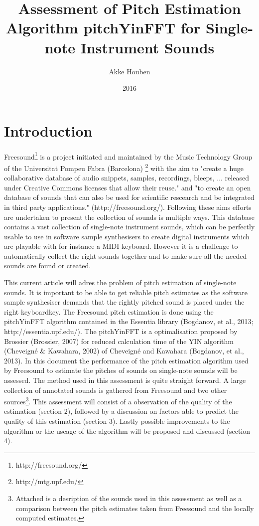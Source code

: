 \documentclass{proc}
\title{Assessment of Pitch Estimation Algorithm pitchYinFFT for Single-note Instrument Sounds}
\author{Akke Houben}
\date{2016}
\begin{document}
\maketitle

\section{Introduction}
Freesound\footnote{http://freesound.org/} is a project initiated and maintained by the Music Technology Group of the Universitat Pompeu Fabra (Barcelona) \footnote{http://mtg.upf.edu/} with the aim to "create a huge collaborative database of audio snippets, samples, recordings, bleeps, ... released under Creative Commons licenses that allow their reuse." and "to create an open database of sounds that can also be used for scientific rescearch and be integrated in third party applications." (http://freesound.org/). Following these aims efforts are undertaken to present the collection of sounds is multiple ways. This database contains a vast collection of single-note instrument sounds, which can be perfectly usable to use in software sample synthesisers to create digital instruments which are playable with for instance a MIDI keyboard. However it is a challenge to automatically collect the right sounds together and to make sure all the needed sounds are found or created. 

This current article will adres the problem of pitch estimation of single-note sounds. It is important to be able to get reliable pitch estimates as the software sample synthesiser demands that the rightly pitched sound is placed under the right keyboardkey. The Freesound pitch estimation is done using the pitchYinFFT algorithm contained in the Essentia library (Bogdanov, et al., 2013; http://essentia.upf.edu/). The pitchYinFFT is a optimalisation proposed by Brossier (Brossier, 2007) for reduced calculation time of the YIN algorithm (Cheveigné \& Kawahara, 2002) of Cheveigné and Kawahara (Bogdanov, et al., 2013). 
In this document the performance of the pitch estimation algorithm used by Freesound to estimate the pitches of sounds on single-note sounds will be assessed. The method used in this assessment is quite straight forward. A large collection of annotated sounds is gathered from Freesound and two other sources\footnote{Attached is a desription of the sounds used in this assessment as well as a comparison between the pitch estimates taken from Freesound and the locally computed estimates.}.
 This assessment will consist of a observation of the quality of the estimation (section 2), followed by a discussion on factors able to predict the quality of this estimation (section 3). Lastly possible improvements to the algorithm or the useage of the algorithm will be proposed and discussed (section 4).
\end{document}
